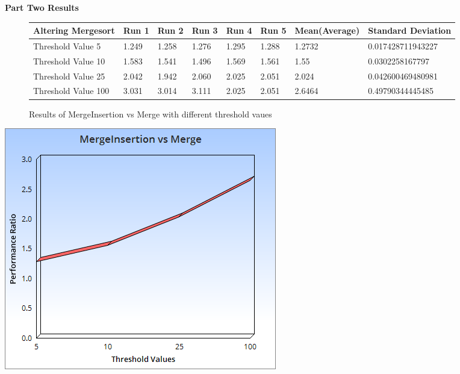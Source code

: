\documentclass{article}
\begin{document}
\newpage

\begin{center}
\textbf{Part Two Results}
\end{center}

\begin{figure}[H]
\centering
\begin{adjustwidth}{-3.4cm}{}
\begin{tabular}{| l | l | l | l | l | l | l | l |}
\hline
Altering Mergesort & Run 1 & Run 2 & Run 3 & Run 4 & Run 5 & Mean(Average) & Standard Deviation\\ \hline
Threshold Value 5 & 1.249 & 1.258 & 1.276 & 1.295 & 1.288 & 1.2732 & 0.017428711943227\\ \hline
Threshold Value 10 & 1.583 & 1.541 & 1.496 & 1.569 & 1.561 & 1.55 & 0.0302258167797\\ \hline
Threshold Value 25 & 2.042 & 1.942 & 2.060 & 2.025 & 2.051 & 2.024 & 0.042600469480981\\ \hline
Threshold Value 100 & 3.031 & 3.014 & 3.111 & 2.025 & 2.051 & 2.6464 & 0.49790344445485\\ \hline
\end{tabular}
\caption{Results of MergeInsertion vs Merge with different threshold vaues}
\end{adjustwidth}
\end{figure}

\includegraphics[scale=0.75]{MergeInsertion.png}

\newpage
\end{document}
